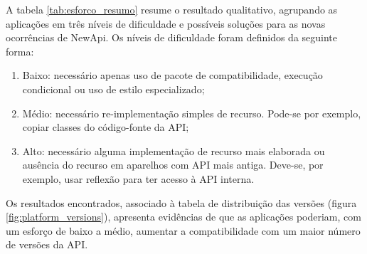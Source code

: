 A tabela \ref{tab:esforco_resumo} resume o resultado qualitativo, agrupando as aplicações
em três níveis de dificuldade e possíveis soluções para as novas ocorrências de NewApi.
Os níveis de dificuldade foram definidos da seguinte forma:
\begin{enumerate}
	\item Baixo: necessário apenas uso de pacote de compatibilidade, execução condicional ou
	uso de estilo especializado;
	\item Médio: necessário re-implementação simples de recurso. Pode-se por exemplo, copiar
	classes do código-fonte da API;
	\item Alto: necessário alguma implementação de recurso mais elaborada ou ausência do
	recurso em aparelhos com API mais antiga. Deve-se, por exemplo, usar reflexão para
	ter acesso à API interna.
\end{enumerate}
Os resultados encontrados, associado à tabela de distribuição das versões (figura 
\ref{fig:platform_versions}), apresenta evidências de que as aplicações poderiam,
com um esforço de baixo a médio, aumentar a compatibilidade com um maior número de
versões da API.  

